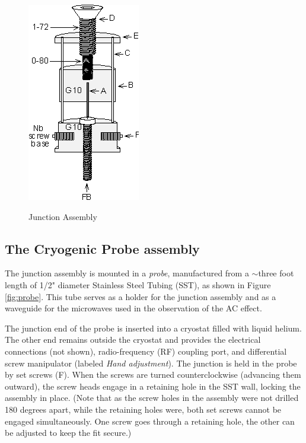 \documentclass{../lab}
\begin{document}
\begin{figure}[h]
    \centering
    \href{http://experimentationlab.berkeley.edu/sites/default/files/images/JOS5.gif}{\includegraphics[width=0.4\linewidth]{images/JOS5.png}}
    \caption{Junction Assembly}
    \label{fig:JunctionAssemblyDiagram}
\end{figure}

\subsection{The Cryogenic Probe assembly}

The junction assembly is mounted in a \emph{probe}, manufactured from a $\sim$three foot length of 1/2" diameter Stainless Steel Tubing (SST), as shown in Figure \ref{fig:probe}. This tube serves as a holder for the junction assembly and as a waveguide for the microwaves used in the observation of the AC effect.

The junction end of the probe is inserted into a cryostat filled with liquid helium. The other end remains outside the cryostat and provides the electrical connections (not shown), radio-frequency (RF) coupling port, and differential screw manipulator (labeled \emph{Hand adjustment}). The junction is held in the probe by set screws (F). When the screws are turned counterclockwise (advancing them outward), the screw heads engage in a retaining hole in the SST wall, locking the assembly in place. (Note that as the screw holes in the assembly were not drilled 180 degrees apart, while the retaining holes were, both set screws cannot be engaged simultaneously. One screw goes through a retaining hole, the other can be adjusted to keep the fit secure.)
\end{document}
